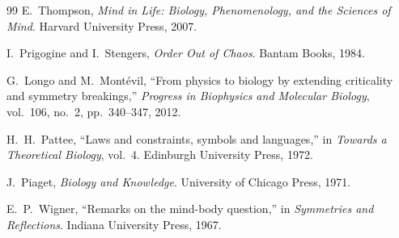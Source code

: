 \documentclass[11pt, a4paper]{article}
\theoremstyle{plain}
\theoremstyle{definition}
\theoremstyle{remark}
\begin{document}
\begin{thebibliography}{99}
E.~Thompson,
\newblock \emph{Mind in Life: Biology, Phenomenology, and the Sciences of Mind}.
\newblock Harvard University Press, 2007.

I.~Prigogine and I.~Stengers,
\newblock \emph{Order Out of Chaos}.
\newblock Bantam Books, 1984.

G.~Longo and M.~Mont\'evil,
\newblock ``From physics to biology by extending criticality and symmetry breakings,''
\newblock \emph{Progress in Biophysics and Molecular Biology}, vol.~106, no.~2, pp.~340--347, 2012.

H.~H.~Pattee,
\newblock ``Laws and constraints, symbols and languages,''
\newblock in \emph{Towards a Theoretical Biology}, vol.~4.
\newblock Edinburgh University Press, 1972.

J.~Piaget,
\newblock \emph{Biology and Knowledge}.
\newblock University of Chicago Press, 1971.

E.~P.~Wigner,
\newblock ``Remarks on the mind-body question,''
\newblock in \emph{Symmetries and Reflections}.
\newblock Indiana University Press, 1967.

\end{thebibliography}
\end{document}
